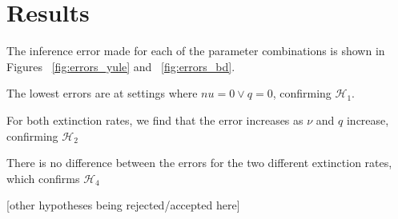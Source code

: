 \section{Results}

The inference error made for each of the parameter combinations
is shown in Figures ~\ref{fig:errors_yule} and ~\ref{fig:errors_bd}. 

The lowest errors are at settings where $nu = 0 \vee q = 0$,
confirming $\mathcal{H}_1$.

For both extinction rates,
we find that the error increases as $\nu$
and $q$ increase, confirming $\mathcal{H}_2$

There is no difference between the
errors for the two different extinction rates, which
confirms $\mathcal{H}_4$

[other hypotheses being rejected/accepted here]
